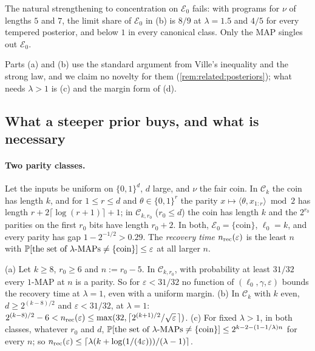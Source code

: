\begin{remark}\label{rem:recovery:posterior}
The natural strengthening to concentration on $\mathcal E_0$ fails: with programs for $\nu$ of lengths $5$ and $7$, the limit share of $\mathcal E_0$ in (b) is $8/9$ at $\lambda=1.5$ and $4/5$ for every tempered posterior, and below $1$ in every canonical class. Only the MAP singles out $\mathcal E_0$.
\end{remark}

\begin{remark}\label{rem:recovery:method}
Parts (a) and (b) use the standard argument from Ville's inequality and the strong law, and we claim no novelty for them (\cref{rem:related:posteriors}); what needs $\lambda>1$ is (c) and the margin form of (d).
\end{remark}

\subsection{What a steeper prior buys, and what is necessary}\label{sec:recovery:lambda1}

\paragraph{Two parity classes.} Let the inputs be uniform on $\{0,1\}^d$, $d$ large, and $\nu$ the fair coin. In $\mathcal C_k$ the coin has length $k$, and for $1\le r\le d$ and $\theta\in\{0,1\}^r$ the parity $x\mapsto\langle\theta,x_{1:r}\rangle\bmod2$ has length $r+2\lceil\log(r+1)\rceil+1$; in $\mathcal C_{k,r_0}$ ($r_0\le d$) the coin has length $k$ and the $2^{r_0}$ parities on the first $r_0$ bits have length $r_0+2$. In both, $\mathcal E_0=\{\text{coin}\}$, $\ell_0=k$, and every parity has gap $1-2^{-1/2}>0.29$. The \emph{recovery time} $n_{\rm rec}(\varepsilon)$ is the least $n$ with $\mathbb{P}[\text{the set of $\lambda$-MAPs}\ne\{\text{coin}\}]\le\varepsilon$ at all larger $n$.

\begin{proposition}[$\lambda=1$ against $\lambda>1$]\label{prop:recovery:lambda1}
(a) Let $k\ge8$, $r_0\ge6$ and $n:=r_0-5$. In $\mathcal C_{k,r_0}$, with probability at least $31/32$ every $1$-MAP at $n$ is a parity. So for $\varepsilon<31/32$ no function of $(\ell_0,\gamma,\varepsilon)$ bounds the recovery time at $\lambda=1$, even with a uniform margin.
(b) In $\mathcal C_k$ with $k$ even, $d\ge2^{(k-8)/2}$ and $\varepsilon<31/32$, at $\lambda=1$: $2^{(k-8)/2}-6<n_{\rm rec}(\varepsilon)\le\max(32,\lceil2^{(k+1)/2}/\sqrt\varepsilon\,\rceil)$.
(c) For fixed $\lambda>1$, in both classes, whatever $r_0$ and $d$, $\mathbb{P}[\text{the set of $\lambda$-MAPs}\ne\{\text{coin}\}]\le2^{k-2-(1-1/\lambda)n}$ for every $n$; so $n_{\rm rec}(\varepsilon)\le\lceil\lambda(k+\log(1/(4\varepsilon)))/(\lambda-1)\rceil$.
\end{proposition}

